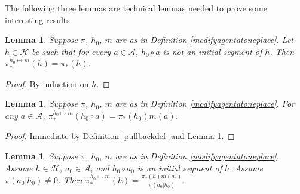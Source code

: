 \documentclass{article}
\newtheorem{lemma}[theorem]{Lemma}
\begin{document}
The following three lemmas are technical lemmas needed to prove
some interesting results.

\begin{lemma}
\label{firsttechlemmaforgenericity}
    Suppose $\pi$, $h_0$, $m$ are as in Definition \ref{modifyagentatoneplace}.
    Let $h\in\mathcal H$ be such that
    for every $a\in\mathcal A$,
    $h_0\circ a$ is not an initial segment of $h$.
    Then $\pi^{h_0\mapsto m}_*(h)=\pi_*(h)$.
\end{lemma}

\begin{proof}
    By induction on $h$.
\end{proof}

\begin{lemma}
\label{thirdtechlemmaforgenericity}
    Suppose $\pi$, $h_0$, $m$ are as in Definition \ref{modifyagentatoneplace}.
    For any $a\in\mathcal A$,
    $\pi^{h_0\mapsto m}_*(h_0\circ a)=\pi_*(h_0)m(a)$.
\end{lemma}

\begin{proof}
    Immediate by Definition \ref{pullbackdef} and Lemma \ref{firsttechlemmaforgenericity}.
\end{proof}

\begin{lemma}
\label{secondtechlemmaforgenericity}
    Suppose $\pi$, $h_0$, $m$ are as in Definition \ref{modifyagentatoneplace}.
    Assume $h\in\mathcal H$, $a_0\in\mathcal A$, and $h_0\circ a_0$ is
    an initial segment of $h$. Assume $\pi(a_0|h_0)\not=0$. Then
    $\pi^{h_0\mapsto m}_*(h) = \frac{\pi_*(h)m(a_0)}{\pi(a_0|h_0)}$.
\end{lemma}
\end{document}
